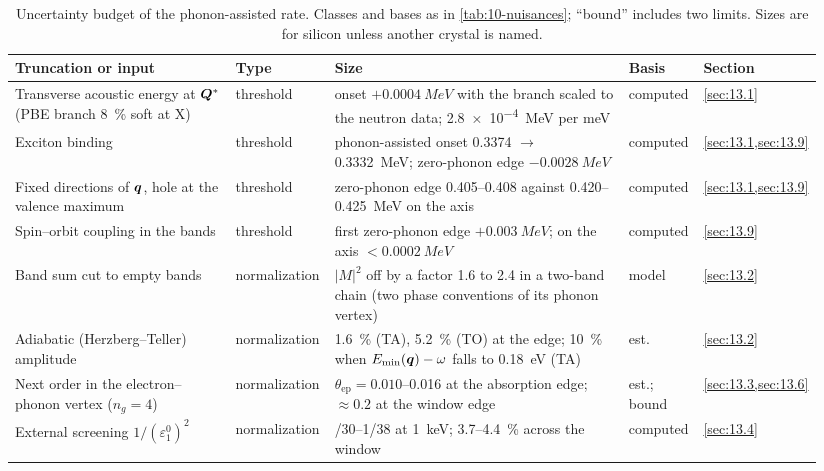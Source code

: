 \begin{table}[tbp]
  \caption{Uncertainty budget of the phonon-assisted rate. Classes and bases as in \cref{tab:10-nuisances}; ``bound'' includes two limits. Sizes are for silicon unless another crystal is named.}
  \label{tab:13-nuisances}
  \centering\scriptsize\setlength{\tabcolsep}{3pt}
  \begin{tabular}{@{}>{\raggedright\arraybackslash}p{0.27\linewidth}>{\raggedright\arraybackslash}p{0.12\linewidth}>{\raggedright\arraybackslash}p{0.36\linewidth}>{\raggedright\arraybackslash}p{0.09\linewidth}>{\raggedright\arraybackslash}p{0.10\linewidth}@{}}
    \toprule
    Truncation or input & Type & Size & Basis & Section \\
    \midrule
    Transverse acoustic energy at $\bm{Q}^*$ (PBE branch \SI{8}{\percent} soft at X) & threshold & onset $+\SI{0.0004}{MeV}$ with the branch scaled to the neutron data; \SI{2.8e-4}{MeV} per meV & computed & \cref{sec:13.1} \\
    Exciton binding & threshold & phonon-assisted onset 0.3374 $\to$ \SI{0.3332}{MeV}; zero-phonon edge $-\SI{0.0028}{MeV}$ & computed & \cref{sec:13.1,sec:13.9} \\
    Fixed directions of $\bm{q}$, hole at the valence maximum & threshold & zero-phonon edge 0.405--0.408 against 0.420--\SI{0.425}{MeV} on the axis & computed & \cref{sec:13.1,sec:13.9} \\
    Spin--orbit coupling in the bands & threshold & first zero-phonon edge $+\SI{0.003}{MeV}$; on the axis $< \SI{0.0002}{MeV}$ & computed & \cref{sec:13.9} \\
    Band sum cut to empty bands & normali\-zation & $|M|^2$ off by a factor 1.6 to 2.4 in a two-band chain (two phase conventions of its phonon vertex) & model & \cref{sec:13.2} \\
    Adiabatic (Herzberg--Teller) amplitude & normali\-zation & \SI{1.6}{\percent} (TA), \SI{5.2}{\percent} (TO) at the edge; \SI{10}{\percent} when $E_{\mathrm{min}}(\bm{q}) - \omega$ falls to \SI{0.18}{eV} (TA) & est. & \cref{sec:13.2} \\
    Next order in the electron--phonon vertex ($n_g = 4$) & normali\-zation & $\theta_{\mathrm{ep}} = 0.010$--0.016 at the absorption edge; $\approx 0.2$ at the window edge & est.; bound & \cref{sec:13.3,sec:13.6} \\
    External screening $1/(\varepsilon_1^0)^2$ & normali\-zation & 1/30--1/38 at \SI{1}{keV}; 3.7--\SI{4.4}{\percent} across the window & computed & \cref{sec:13.4} \\

\end{tabular}
\end{table}

